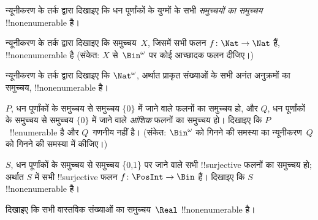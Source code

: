 \documentclass[../../../include/open-logic-section]{subfiles}
\begin{document}
\begin{prob}
न्यूनीकरण के तर्क द्वारा दिखाइए कि धन पूर्णांकों के युग्मों के सभी
\emph{समुच्चयों का समुच्चय} !!{nonenumerable} है।
\end{prob}

\begin{prob}\label{sfr:siz:red:prob:nat-nat}
  न्यूनीकरण के तर्क द्वारा दिखाइए कि समुच्चय~$X$, जिसमें सभी फलन
  $f\colon \Nat \to \Nat$ हैं, !!{nonenumerable} है (संकेत: $X$
  से~$\Bin^\omega$ पर कोई
  आच्छादक फलन दीजिए।)
\end{prob}

\begin{prob}
न्यूनीकरण के तर्क द्वारा दिखाइए कि $\Nat^\omega$, अर्थात प्राकृत संख्याओं के
सभी अनंत अनुक्रमों का समुच्चय, !!{nonenumerable} है।
\end{prob}

\begin{prob}
$P$, धन पूर्णांकों के समुच्चय से समुच्चय $\{0\}$ में जाने वाले फलनों का
समुच्चय हो, और $Q$, धन पूर्णांकों के समुच्चय से समुच्चय $\{0\}$ में जाने
वाले \emph{आंशिक} फलनों का समुच्चय हो। दिखाइए कि $P$~!!{enumerable} है और
$Q$~गणनीय नहीं है। (संकेत: $\Bin^\omega$ को गिनने की समस्या का
न्यूनीकरण~$Q$ को गिनने की समस्या में कीजिए।)
\end{prob}

\begin{prob}
$S$, धन पूर्णांकों के समुच्चय से समुच्चय \{0,1\} पर जाने वाले सभी
!!{surjective} फलनों का समुच्चय हो; अर्थात $S$ में सभी !!{surjective} फलन
$f\colon \PosInt \to \Bin$ हैं। दिखाइए कि $S$ !!{nonenumerable} है।
\end{prob}

\begin{prob}
दिखाइए कि सभी वास्तविक संख्याओं का समुच्चय~$\Real$ !!{nonenumerable} है।
\end{prob}
\end{document}
